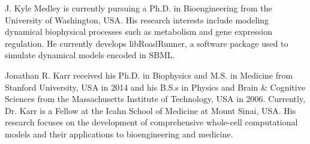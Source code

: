 \documentclass[journal,transmag,twoside]{IEEEtran}
\begin{document}
\begin{IEEEbiography}{J. Kyle Medley}
is currently pursuing a Ph.D. in Bioengineering from the University of Washington, USA.
His research interests include modeling dynamical biophysical processes such as
metabolism and gene expression regulation.
He currently develops libRoadRunner, a software package used to simulate dynamical models encoded in SBML.
\end{IEEEbiography}

\begin{IEEEbiography}{Jonathan R. Karr}
received his Ph.D. in Biophysics and M.S. in Medicine from Stanford University, USA in 2014 and his B.S.s in Physics and Brain \& Cognitive Sciences from the Massachusetts Institute of Technology, USA in 2006. Currently, Dr. Karr is a Fellow at the Icahn School of Medicine at Mount Sinai, USA. His research focuses on the development of comprehensive whole-cell computational models and their applications to bioengineering and medicine.
\end{IEEEbiography}

\vfill
\end{document}
